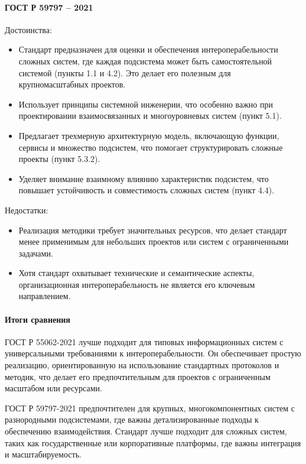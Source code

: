 \paragraph{ГОСТ Р 59797 -- 2021}

Достоинства:

\begin{itemize}
	\item Стандарт предназначен для оценки
		и обеспечения интероперабельности сложных систем,
		где каждая подсистема может
		быть самостоятельной системой (пункты 1.1 и 4.2).
		Это делает его полезным для крупномасштабных проектов.
	\item Использует принципы системной инженерии,
		что особенно важно при проектировании взаимосвязанных
		и многоуровневых систем (пункт 5.1).
	\item Предлагает трехмерную архитектурную модель,
		включающую функции, сервисы и множество подсистем,
		что помогает структурировать сложные проекты (пункт 5.3.2).
	\item Уделяет внимание взаимному влиянию характеристик подсистем,
		что повышает устойчивость и совместимость сложных систем (пункт 4.4).
\end{itemize}

Недостатки:

\begin{itemize}
	\item Реализация методики требует значительных ресурсов,
		что делает стандарт менее применимым для небольших проектов
		или систем с ограниченными задачами.
	\item Хотя стандарт охватывает технические и семантические аспекты,
		организационная интероперабельность
		не является его ключевым направлением.
\end{itemize}

\paragraph{Итоги сравнения}

ГОСТ Р 55062-2021 лучше подходит для типовых информационных систем
с универсальными требованиями к интероперабельности.
Он обеспечивает простую реализацию,
ориентированную на использование стандартных протоколов и методик,
что делает его предпочтительным
для проектов с ограниченным масштабом или ресурсами.

ГОСТ Р 59797-2021 предпочтителен для крупных,
многокомпонентных систем с разнородными подсистемами,
где важны детализированные подходы к обеспечению взаимодействия.
Стандарт лучше подходит для сложных систем,
таких как государственные или корпоративные платформы,
где важны интеграция и масштабируемость.

